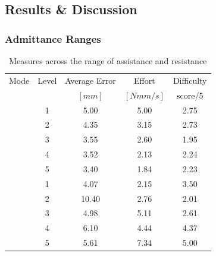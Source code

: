 \documentclass[12pt]{report}
\begin{document}
	
		\subsection{Results \& Discussion} \label{sec:results} 
		
		
	
	\subsubsection{Admittance Ranges}
	
	
	\setlength\arrayrulewidth{1pt}	
	
	\begin{table}[ht] \label{tab:expA}
	\centering
	\caption{Measures across the range of assistance and resistance}
	\begin{tabular}{c c c c c}
	\toprule
	Mode & Level & Average Error & Effort & Difficulty \\
	& & \tiny $[mm]$ & \tiny $[N mm/s]$  & \tiny $\text{score}/5$ \\
	\midrule
	\cellcolor{white} 						& 1 & 5.00 & 5.00   & 2.75 \\ 
	\rowcolor{gray!10}		
	\cellcolor{white}						& 2 & 4.35 & 3.15  & 2.73 \\ 
	\cellcolor{white}						& 3 & 3.55 & 2.60  & 1.95 \\ 
	\rowcolor{gray!10}
	\cellcolor{white}						& 4 & 3.52 & 2.13  & 2.24 \\ 
	\cellcolor{white}	\multirow{-5}{*}{Assist} 	& 5 & 3.40  & 1.84  & 2.23 \\ 
	\midrule
	\rowcolor{gray!10}
	\cellcolor{white} 						& 1 & 4.07 & 2.15  & 3.50 \\ 
	\cellcolor{white}
	\cellcolor{white}						& 2 & 10.40 & 2.76  & 2.01 \\
	\rowcolor{gray!10}
	\cellcolor{white}						& 3 & 4.98 & 5.11  & 2.61 \\ 
	\cellcolor{white}						& 4 & 6.10 & 4.44  & 4.37 \\ 
	\rowcolor{gray!10}
	\cellcolor{white}	\multirow{-5}{*}{Resist}		& 5 & 5.61 & 7.34  & 5.00 \\ 
	\bottomrule
	\end{tabular}
	\end{table}
	
\end{document}

